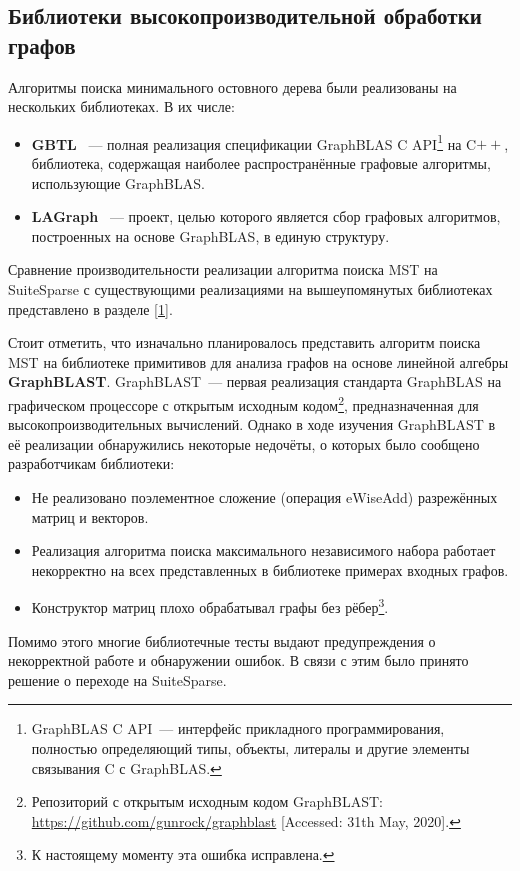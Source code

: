 \documentclass[14pt]{matmex-diploma-custom}
\begin{document}
\subsection{Библиотеки высокопроизводительной обработки графов}
Алгоритмы поиска минимального остовного дерева были реализованы на нескольких библиотеках. В их числе:
\begin{itemize}
\item \textbf{GBTL}~\cite{GBTL} --- полная реализация спецификации GraphBLAS C API\footnote{GraphBLAS C API~--- интерфейс прикладного программирования, полностью определяющий типы, объекты, литералы и другие элементы связывания C с GraphBLAS.} на C$++$, библиотека, содержащая наиболее распространённые графовые алгоритмы, использующие GraphBLAS.
\item \textbf{LAGraph}~\cite{LAGraph} --- проект, целью которого является сбор графовых алгоритмов, построенных на основе GraphBLAS, в единую структуру.
\end{itemize}
Сравнение производительности реализации алгоритма поиска MST на SuiteSparse с существующими реализациями на вышеупомянутых библиотеках представлено в разделе \ref{1}.

Стоит отметить, что изначально планировалось представить алгоритм поиска MST на библиотеке примитивов для анализа графов на основе линейной алгебры \textbf{GraphBLAST}. GraphBLAST~\cite{GraphBLAST}--- первая реализация стандарта GraphBLAS на графическом процессоре с открытым исходным кодом\footnote{Репозиторий с открытым исходным кодом GraphBLAST: \url{https://github.com/gunrock/graphblast} [Accessed: 31th May, 2020].}, предназначенная для высокопроизводительных вычислений. Однако в ходе изучения GraphBLAST в её реализации обнаружились некоторые недочёты, о которых было сообщено разработчикам библиотеки:
\begin{itemize}
\item Не реализовано поэлементное сложение (операция eWiseAdd) разрежённых матриц и векторов. 
\item Реализация алгоритма поиска максимального независимого набора работает некорректно на всех представленных в библиотеке примерах входных графов. 
\item Конструктор матриц плохо обрабатывал графы без рёбер\footnote{К настоящему моменту эта ошибка исправлена.}.
\end{itemize}
Помимо этого многие библиотечные тесты выдают предупреждения о некорректной работе и обнаружении ошибок. В связи с этим было принято решение о переходе на SuiteSparse.
\end{document}
